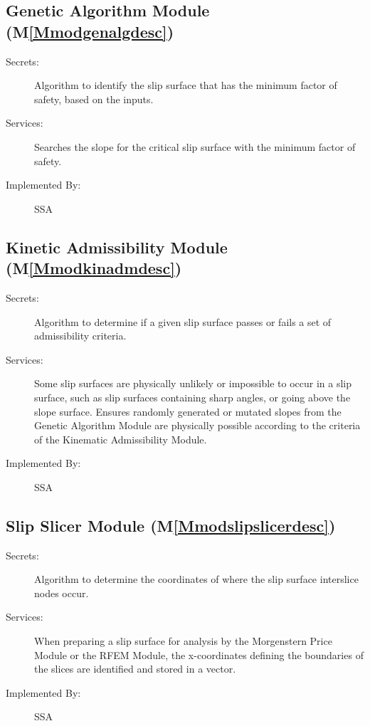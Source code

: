 \documentclass[12pt]{article}
\begin{document}
\subsection{Genetic Algorithm Module (M\ref{Mmodgenalgdesc})}
\label{Sec:GeneAlgoModu()}
\begin{description}
\item[Secrets:]Algorithm to identify the slip surface that has the minimum factor of safety, based on the inputs.
\item[Services:]Searches the slope for the critical slip surface with the minimum factor of safety.
\item[Implemented By:]SSA
\end{description}
\subsection{Kinetic Admissibility Module (M\ref{Mmodkinadmdesc})}
\label{Sec:KineAdmiModu()}
\begin{description}
\item[Secrets:]Algorithm to determine if a given slip surface passes or fails a set of admissibility criteria.
\item[Services:]Some slip surfaces are physically unlikely or impossible to occur in a slip surface, such as slip surfaces containing sharp angles, or going above the slope surface. Ensures randomly generated or mutated slopes from the Genetic Algorithm Module are physically possible according to the criteria of the Kinematic Admissibility Module.
\item[Implemented By:]SSA
\end{description}
\subsection{Slip Slicer Module (M\ref{Mmodslipslicerdesc})}
\label{Sec:SlipSlicModu()}
\begin{description}
\item[Secrets:]Algorithm to determine the coordinates of where the slip surface interslice nodes occur.
\item[Services:]When preparing a slip surface for analysis by the Morgenstern Price Module or the RFEM Module, the x-coordinates defining the boundaries of the slices are identified and stored in a vector.
\item[Implemented By:]SSA
\end{description}
\end{document}
